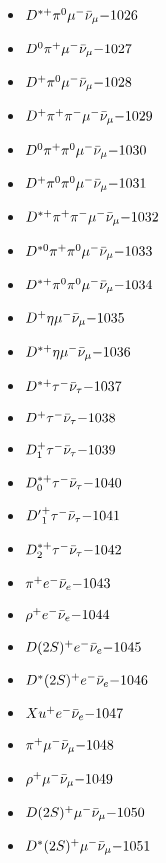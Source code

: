 \begin{multicols}{3}
\begin{itemize}
 \item $ D^{*+} \pi^{0} \mu^{-} \bar{\nu}_{\mu} \hfill{-1026}$
 \item $ D^{0} \pi^{+} \mu^{-} \bar{\nu}_{\mu} \hfill{-1027}$
 \item $ D^{+} \pi^{0} \mu^{-} \bar{\nu}_{\mu} \hfill{-1028}$
 \item $ D^{+} \pi^{+} \pi^{-} \mu^{-} \bar{\nu}_{\mu} \hfill{-1029}$
 \item $ D^{0} \pi^{+} \pi^{0} \mu^{-} \bar{\nu}_{\mu} \hfill{-1030}$
 \item $ D^{+} \pi^{0} \pi^{0} \mu^{-} \bar{\nu}_{\mu} \hfill{-1031}$
 \item $ D^{*+} \pi^{+} \pi^{-} \mu^{-} \bar{\nu}_{\mu} \hfill{-1032}$
 \item $ D^{*0} \pi^{+} \pi^{0} \mu^{-} \bar{\nu}_{\mu} \hfill{-1033}$
 \item $ D^{*+} \pi^{0} \pi^{0} \mu^{-} \bar{\nu}_{\mu} \hfill{-1034}$
 \item $ D^{+} \eta \mu^{-} \bar{\nu}_{\mu} \hfill{-1035}$
 \item $ D^{*+} \eta \mu^{-} \bar{\nu}_{\mu} \hfill{-1036}$
 \item $ D^{*+} \tau^{-} \bar{\nu}_{\tau} \hfill{-1037}$
 \item $ D^{+} \tau^{-} \bar{\nu}_{\tau} \hfill{-1038}$
 \item $ D_{1}^{+} \tau^{-} \bar{\nu}_{\tau} \hfill{-1039}$
 \item $ D_{0}^{*+} \tau^{-} \bar{\nu}_{\tau} \hfill{-1040}$
 \item $ {D^{\prime}}_{1}^{+} \tau^{-} \bar{\nu}_{\tau} \hfill{-1041}$
 \item $ D_{2}^{*+} \tau^{-} \bar{\nu}_{\tau} \hfill{-1042}$
 \item $ \pi^{+} e^{-} \bar{\nu}_{e} \hfill{-1043}$
 \item $ \rho^{+} e^{-} \bar{\nu}_{e} \hfill{-1044}$
 \item $ D(2S)^{+} e^{-} \bar{\nu}_{e} \hfill{-1045}$
 \item $ D^{*}(2S)^{+} e^{-} \bar{\nu}_{e} \hfill{-1046}$
 \item $ Xu^{+} e^{-} \bar{\nu}_{e} \hfill{-1047}$
 \item $ \pi^{+} \mu^{-} \bar{\nu}_{\mu} \hfill{-1048}$
 \item $ \rho^{+} \mu^{-} \bar{\nu}_{\mu} \hfill{-1049}$
 \item $ D(2S)^{+} \mu^{-} \bar{\nu}_{\mu} \hfill{-1050}$
 \item $ D^{*}(2S)^{+} \mu^{-} \bar{\nu}_{\mu} \hfill{-1051}$

\end{itemize}
\end{multicols}

